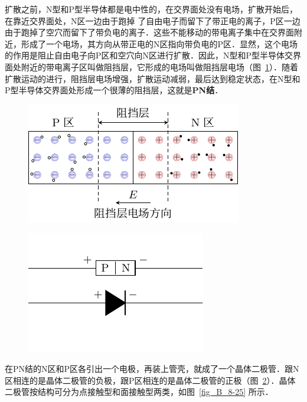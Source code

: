 扩散之前，N型和P型半导体都是电中性的，在交界面处没有电场，扩散开始后，在靠近交界面处，N区一边由于跑掉
了自由电子而留下了带正电的离子，P区一边由于跑掉了空穴而留下了带负电的离子．这些不能移动的带电离子集中在交界面附近，形成了一个电场，其方向从带正电的N区指向带负电的P区．显然，这个电场的作用是阻止自由电子向P区和空穴向N区进行扩散．因此，N型和P型半导体交界面处附近的带电离子区叫做阻挡层，它形成的电场叫做阻挡层电场（图~\ref{fig_B_8-23}）．随着扩散运动的进行，阻挡层电场增强，扩散运动减弱，最后达到稳定状态，在N型和P型半导体交界面处形成一个很薄的阻挡层，这就是\textbf{PN结}．
\begin{figure}[htbp]
    \centering
    \includegraphics{fig/B/8-23.pdf}
    \caption{}\label{fig_B_8-23}
\end{figure}
\begin{figure}[htbp]
    \centering
    \includegraphics{fig/B/8-24.pdf}
    \caption{}\label{fig_B_8-24}
\end{figure}
在PN结的N区和P区各引出一个电极，再装上管壳，就成了一个晶体二极管．跟N区相连的是晶体二极管的负极，跟P区相连的是晶体二极管的正极（图~\ref{fig_B_8-24}）．晶体二极管按结构可分为点接触型和面接触型两类，如图~\ref{fig_B_8-25} 所示．
